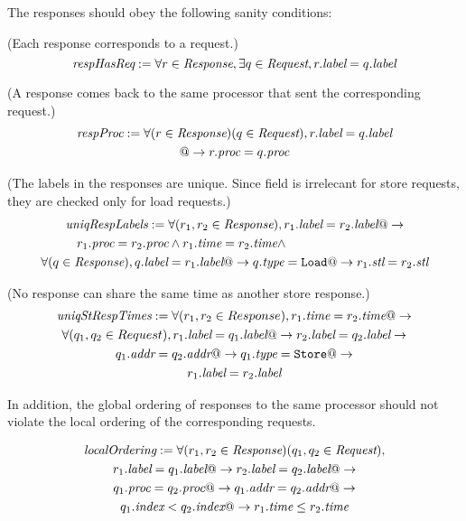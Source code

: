 The responses should obey the following sanity conditions:
\begin{defn} (Each response corresponds to a request.)
\begin{equation*}
\textit{respHasReq} := \forall r\in\textit{Response}, \exists q\in\textit{Request}, r.\textit{label} = q.\textit{label}
\end{equation*}
\end{defn}

\begin{defn} (A response comes back to the same processor that sent the corresponding request.)
\begin{multline*}
\textit{respProc} := \forall (r\in\textit{Response}) (q\in\textit{Request}), r.\textit{label} = q.\textit{label} \\ @-> r.\textit{proc} = q.\textit{proc}
\end{multline*}
\newline
\end{defn}

\begin{defn} (The labels in the responses are unique. Since \stl{} field is irrelecant for
store requests, they are checked only for load requests.)
\begin{multline*}
\textit{uniqRespLabels} := \forall (r_1, r_2 \in \Response), r_1.\mylabel = r_2.\mylabel @-> \\
\hspace{1cm} r_1.\proc = r_2.\proc \wedge r_1.\mytime = r_2.\mytime \wedge \hfill \\
\forall (q \in \Response), q.\mylabel = r_1.\mylabel @->
q.\desc = \Ld @-> r_1.\stl = r_2.\stl
\end{multline*}
\end{defn}

\begin{defn} (No response can share the same time as another store response.)
\begin{multline*}
\textit{uniqStRespTimes} := 
\forall (r_1, r_2 \in Response), r_1.\textit{time} = r_2.\textit{time} @-> \\
\forall (q_1, q_2 \in Request), r_1.\textit{label} = q_1.\textit{label} @->
r_2.\textit{label} = q_2.\textit{label} -> \\
q_1.\textit{addr} = q_2.\textit{addr} @-> q_1.\textit{type} = \texttt{Store} @-> \\ r_1.\textit{label} = r_2.\textit{label}
\end{multline*}
\end{defn}

In addition, the global ordering of responses to the same processor should not
violate the local ordering of the corresponding requests.
\begin{defn}
\begin{multline*}
\textit{localOrdering} :=
\forall (r_1, r_2 \in \textit{Response}) (q_1, q_2 \in \textit{Request}), \\ r_1.\textit{label}
= q_1.\textit{label} @-> r_2.\textit{label} = q_2.\textit{label} @-> \\ q_1.\textit{proc} = q_2.\textit{proc} @->
q_1.\textit{addr} = q_2.\textit{addr} @-> \\ q_1.\textit{index} < q_2.\textit{index} @-> r_1.\textit{time} \le r_2.\textit{time}
\end{multline*}
\end{defn}

